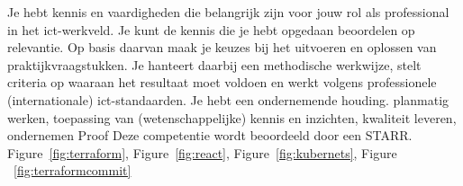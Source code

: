 \competentie
{%
	\competentieformulier
	{%
		Je hebt kennis en vaardigheden die belangrijk zijn voor
		jouw rol als professional in het ict-werkveld. Je kunt de
		kennis die je hebt opgedaan beoordelen op relevantie.
		Op basis daarvan maak je keuzes bij het uitvoeren en
		oplossen van praktijkvraagstukken. Je hanteert daarbij
		een methodische werkwijze, stelt criteria op waaraan
		het resultaat moet voldoen en werkt volgens
		professionele (internationale) ict-standaarden.
		Je hebt een ondernemende houding.
	}
	{%
		planmatig werken,
		toepassing van (wetenschappelijke) kennis en inzichten,
		kwaliteit leveren,
		ondernemen
	}
	{%
		Proof
	}
	{%
		Deze competentie wordt beoordeeld door een STARR.
	}
	{%
		Figure~\ref{fig:terraform}, 
		Figure~\ref{fig:react},
		Figure~\ref{fig:kubernets},
		Figure ~\ref{fig:terraformcommit}
	}
}
